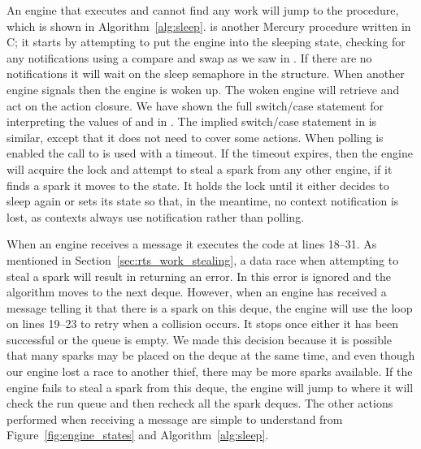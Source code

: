 An engine that executes \idle and cannot find any work will jump to the
\sleep procedure,
which is shown in Algorithm~\ref{alg:sleep}.
\sleep is another Mercury procedure written in C;
it starts by attempting to put the engine into the sleeping state,
checking for any notifications using a compare and swap as we saw in \idle.
If there are no notifications it will wait on the sleep semaphore in the
\enginesleepsync structure.
When another engine signals  then the engine is woken up.
The woken engine will retrieve and act on the action closure.
We have shown the full switch/case statement for interpreting the values of
 and  in \sleep.
The implied switch/case statement in \idle is similar,
except that it does not need to cover some actions.
When polling is enabled the call to  is used with a
timeout.
If the timeout expires,
then the engine will acquire the lock and attempt to
steal a spark from any other engine, if it finds a spark it moves to the
 state.
It holds the lock until it either decides to sleep again or sets its state
so that, in the meantime, no context notification is lost,
as contexts always use notification rather than polling.

When an engine receives a  message it executes
the code at lines 18--31.
As mentioned in Section~\ref{sec:rts_work_stealing},
a data race when attempting to steal a spark will result in
\steal returning an error.
In \trystealspark this error is ignored and the algorithm moves to the next
deque.
However,
when an engine has received a message telling it that there is a spark on
this deque, the engine will use the loop on lines 19--23 to retry when a
collision occurs.
It stops once either it has been successful or the queue is empty.
We made this decision because it is possible that many sparks may be placed
on the deque at the same time,
and even though our engine lost a race to another thief, there may be more
sparks available.
If the engine fails to steal a spark from this deque,
the engine will jump to \idle where it will check the run queue and then
recheck all the spark deques.
The other actions performed when receiving a message are simple to
understand from Figure~\ref{fig:engine_states} and
Algorithm~\ref{alg:sleep}.

